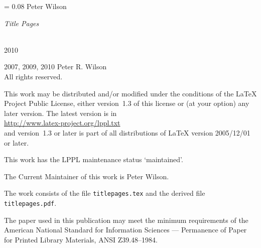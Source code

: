 \documentclass{memoir}
\newlength{\drop}
\newcommand*{\thistitle}{\begingroup%
\parindent=0pt
\drop = 0.08\textheight
\vspace*{\drop}
\hspace*{0.3\textwidth}%
{\LARGE Peter Wilson}\\[2\drop]
\hspace*{0.3\textwidth}{\HUGE\itshape Some Examples of}\par
{\raggedleft\HUGE\itshape Title Pages\par}
\vfill
\settowidth{\bibindent}{\Large The Herries Press}%
\settowidth{\unitlength}{\Large 2006}%
\addtolength{\bibindent}{-\unitlength}%
\hspace*{0.3\textwidth}{\Large The Herries Press}\\[0.5\baselineskip]
\hspace*{0.3\textwidth}%
{\Large 2010}
\vspace*{\drop}
\endgroup}
\begin{document}
\raggedbottom

\frontmatter
\pagestyle{empty}
\thistitle
\clearpage

\begingroup
\footnotesize
\parindent 0pt
\parskip \baselineskip
\textcopyright{} 2007, 2009, 2010 Peter R. Wilson \\
All rights reserved.

    This work may be distributed and/or modified under the conditions
of the LaTeX Project Public License, either version~1.3 of this license
or (at your option) any later version. The latest version is in \\
\hspace*{2em} \url{http://www.latex-project.org/lppl.txt} \\
and version~1.3 or later is part of all distributions of LaTeX
version 2005/12/01 or later.

    This work has the LPPL maintenance status `maintained'.

    The Current Maintainer of this work is Peter Wilson.

    The work consists of the file \texttt{titlepages.tex} and the
derived file \texttt{titlepages.pdf}.

\begin{comment}
This material may be distributed only subject to the terms and conditions
set forth in the Open Publication License v1.0 or later (the latest
version is presently available at \url{http://www.opencontent.org/openpub/}).
Distribution of substantively modified versions of this document is
prohibited without the explicit permission of the copyright holder.
Distribution of the work or derivative of the work in any standard
(paper) book form is prohibited unless prior permission is obtained
from the copyright holder.


The procedures and applications presented in this work have been
included for their instructional value. They have been tested
with care but are not guaranteed for any particular purpose.
The publisher does not offer any warranties or representations,
nor does it accept any liabilities with respect to the
programs or applications.
\end{comment}

The paper used in this publication may meet the minimum
requirements of the American National Standard for
Information Sciences --- Permanence of Paper for Printed
Library Materials, ANSI Z39.48--1984.
\end{document}
